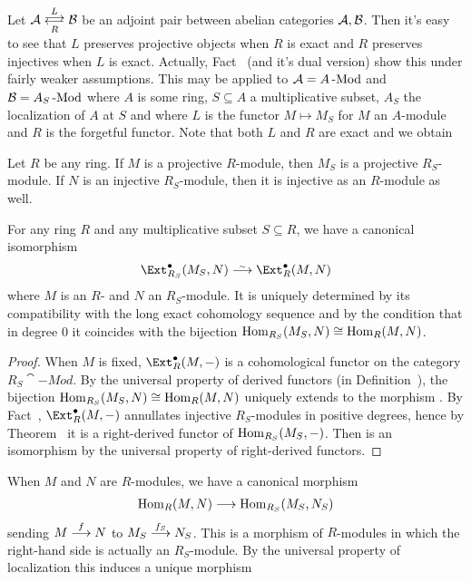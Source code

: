 \documentclass[a4paper,parskip=half,numbers=enddot, DIV=12]{scrreprt}
\begin{document}
Let $\Aa\doublelrmorphism[L][\smash{R}]\Bb$ be an adjoint pair between abelian categories $\mathcal{A},\mathcal{B}$. Then it's easy to see that $L$ preserves projective objects when $R$ is exact and $R$ preserves injectives when $L$ is exact. Actually, Fact~ (and it's dual version) show this under fairly weaker assumptions. This may be applied to $\mathcal{A}=A\operatorname{-Mod}$ and $\mathcal{B}=A_S\operatorname{-Mod}$ where $A$ is some ring, $S\subseteq A$ a multiplicative subset, $A_S$ the localization of $A$ at $S$ and where $L$ is the functor $M\mapsto M_S$ for $M$ an $A$-module and $R$ is the forgetful functor. Note that both $L$ and $R$ are exact and we obtain
\begin{fact}
	Let $R$ be any ring. If $M$ is a projective $R$-module, then $M_S$ is a projective $R_S$-module. If $N$ is an injective $R_S$-module, then it is injective as an $R$-module as well.
\end{fact}
\begin{fact}
	For any ring $R$ and any multiplicative subset $S\subseteq R$, we have a canonical isomorphism
	\begin{align}\lbl{eq:ExtRStoExtR}
		\Ext_{R_S}^\bullet(M_S,N)\isomorphism\Ext_R^\bullet(M,N)
	\end{align}
	where $M$ is an $R$- and $N$ an $R_S$-module. It is uniquely determined by its compatibility with the long exact cohomology sequence and by the condition that in degree $0$ it coincides with the bijection $\operatorname{Hom}_{R_S}(M_S,N)\cong \operatorname{Hom}_R(M,N)$.
\end{fact}
\begin{proof}
	When $M$ is fixed, $\Ext_R^\bullet(M,-)$ is a cohomological functor on the category $R_S\cat{-Mod}$. By the universal property of derived functors (in Definition~), the bijection $\operatorname{Hom}_{R_S}(M_S,N)\cong \operatorname{Hom}_R(M,N)$ uniquely extends to the morphism . By Fact~, $\Ext_R^\bullet(M,-)$ annullates injective $R_S$-modules in positive degrees, hence by Theorem~ it is a right-derived functor of $\operatorname{Hom}_{R_S}(M_S,-)$. Then  is an isomorphism by the universal property of right-derived functors.
\end{proof}
When $M$ and $N$ are $R$-modules, we have a canonical morphism
\begin{align*}
	\Hom_R(M,N)\morphism\Hom_{R_S}(M_S,N_S)
\end{align*}
sending $M\morphism[f]N$ to $M_S\morphism[f_S]N_S$. This is a morphism of $R$-modules in which the right-hand side is actually an $R_S$-module. By the universal property of localization this induces a unique morphism
\end{document}
